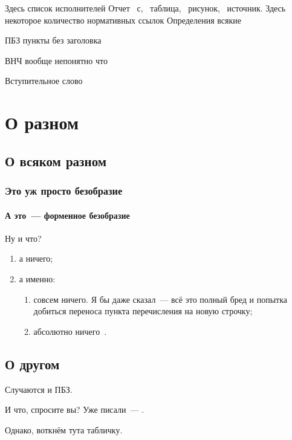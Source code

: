 \documentclass[koi8-r,usehyperref]{G7-32}
\begin{document}
\frontmatter
 \Executors Здесь список исполнителей
 \Referat
 Отчет \totalpages~с, \totaltables~таблица, \totalfigures~рисунок, \totalbibs~источник.
 \tableofcontents
 \NormRefs Здесь некоторое количество нормативных ссылок
 \Defines Определения всякие
 \Abbreviations
 \begin{abbreviation}
  \item[ПБЗ] пункты без заголовка
  \item[ВНЧ] вообще непонятно что
 \end{abbreviation}

 \Introduction Вступительное слово
\mainmatter

\chapter{О разном}
\ttl
\section{О всяком разном}
\ttl
\subsection{Это уж просто безобразие}
\ttl
\subsubsection{А это~--- форменное безобразие}\label{L1}
Ну и что?
\begin{enumerate}
 \item\label{L1:I1}
  а ничего;
 \item
  а именно:
  \begin{enumerate}
   \item
    совсем ничего. Я бы даже сказал~--- всё это полный бред
    и попытка добиться переноса пункта перечисления на новую строчку;
   \item
    абсолютно ничего~\cite{bib:test1}.
  \end{enumerate}
\end{enumerate}

\section{О другом}
\nsubsection Случаются и ПБЗ.

И что, спросите вы? Уже писали~--- .

Однако, воткнём тута табличку.
\end{document}
